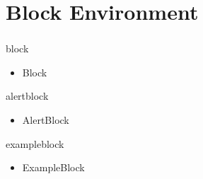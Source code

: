 \documentclass{beamer}
\begin{document}
\section{Block Environment}
\begin{frame}
    \frametitle{\insertsection}
    \begin{block}{block}
        \begin{itemize}
            \item Block
        \end{itemize}
    \end{block}
    \begin{alertblock}{alertblock}
        \begin{itemize}
            \item AlertBlock
        \end{itemize}
    \end{alertblock}
    \begin{exampleblock}{exampleblock}
        \begin{itemize}
            \item ExampleBlock
        \end{itemize}
    \end{exampleblock}
\end{frame}
\end{document}
